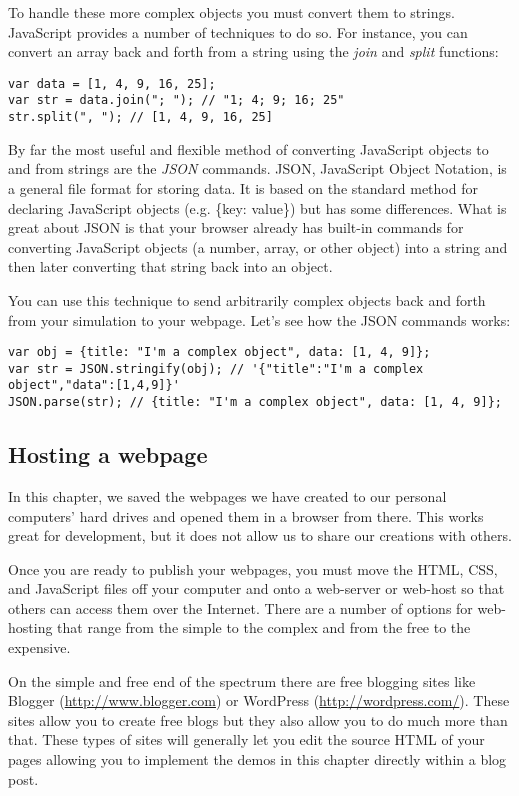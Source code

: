 \documentclass[]{memoir}
\begin{document}
To handle these more complex objects you must convert them to strings.
JavaScript provides a number of techniques to do so. For instance, you
can convert an array back and forth from a string using the \emph{join}
and \emph{split} functions:

\begin{lstlisting}
var data = [1, 4, 9, 16, 25];
var str = data.join("; "); // "1; 4; 9; 16; 25"
str.split(", "); // [1, 4, 9, 16, 25]
\end{lstlisting}

By far the most useful and flexible method of converting JavaScript
objects to and from strings are the \emph{JSON} commands. JSON,
JavaScript Object Notation, is a general file format for storing data.
It is based on the standard method for declaring JavaScript objects
(e.g. \{key: value\}) but has some differences. What is great about JSON
is that your browser already has built-in commands for converting
JavaScript objects (a number, array, or other object) into a string and
then later converting that string back into an object.

You can use this technique to send arbitrarily complex objects back and
forth from your simulation to your webpage. Let's see how the JSON
commands works:

\begin{lstlisting}
var obj = {title: "I'm a complex object", data: [1, 4, 9]};
var str = JSON.stringify(obj); // '{"title":"I'm a complex object","data":[1,4,9]}'
JSON.parse(str); // {title: "I'm a complex object", data: [1, 4, 9]};
\end{lstlisting}

\subsection{Hosting a webpage}

In this chapter, we saved the webpages we have created to our personal
computers' hard drives and opened them in a browser from there. This
works great for development, but it does not allow us to share our
creations with others.

Once you are ready to publish your webpages, you must move the HTML,
CSS, and JavaScript files off your computer and onto a web-server or
web-host so that others can access them over the Internet. There are a
number of options for web-hosting that range from the simple to the
complex and from the free to the expensive.

On the simple and free end of the spectrum there are free blogging sites
like Blogger (\url{http://www.blogger.com}) or WordPress
(\url{http://wordpress.com/}). These sites allow you to create free
blogs but they also allow you to do much more than that. These types of
sites will generally let you edit the source HTML of your pages allowing
you to implement the demos in this chapter directly within a blog post.
\end{document}
